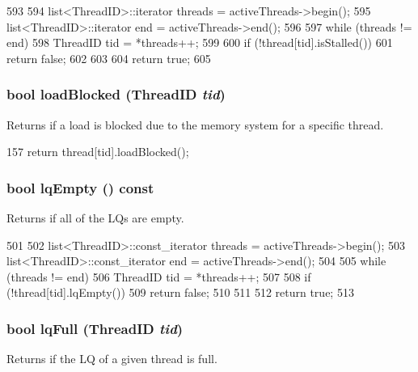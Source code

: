 \begin{DoxyCode}
593 {
594     list<ThreadID>::iterator threads = activeThreads->begin();
595     list<ThreadID>::iterator end = activeThreads->end();
596 
597     while (threads != end) {
598         ThreadID tid = *threads++;
599 
600         if (!thread[tid].isStalled())
601             return false;
602     }
603 
604     return true;
605 }
\end{DoxyCode}
\hypertarget{classLSQ_a95b69602ad810ff8ec5d2b0ea2619945}{
\subsubsection[{loadBlocked}]{\setlength{\rightskip}{0pt plus 5cm}bool loadBlocked ({\bf ThreadID} {\em tid})}}
\label{classLSQ_a95b69602ad810ff8ec5d2b0ea2619945}
Returns if a load is blocked due to the memory system for a specific thread. 


\begin{DoxyCode}
157     { return thread[tid].loadBlocked(); }
\end{DoxyCode}
\hypertarget{classLSQ_a01d2807c1345befcffd168a2a9dbdbf2}{
\subsubsection[{lqEmpty}]{\setlength{\rightskip}{0pt plus 5cm}bool lqEmpty () const}}
\label{classLSQ_a01d2807c1345befcffd168a2a9dbdbf2}
Returns if all of the LQs are empty. 


\begin{DoxyCode}
501 {
502     list<ThreadID>::const_iterator threads = activeThreads->begin();
503     list<ThreadID>::const_iterator end = activeThreads->end();
504 
505     while (threads != end) {
506         ThreadID tid = *threads++;
507 
508         if (!thread[tid].lqEmpty())
509             return false;
510     }
511 
512     return true;
513 }
\end{DoxyCode}
\hypertarget{classLSQ_afa1d531e5f388b1cdc3af03100f63061}{
\subsubsection[{lqFull}]{\setlength{\rightskip}{0pt plus 5cm}bool lqFull ({\bf ThreadID} {\em tid})}}
\label{classLSQ_afa1d531e5f388b1cdc3af03100f63061}
Returns if the LQ of a given thread is full. 


